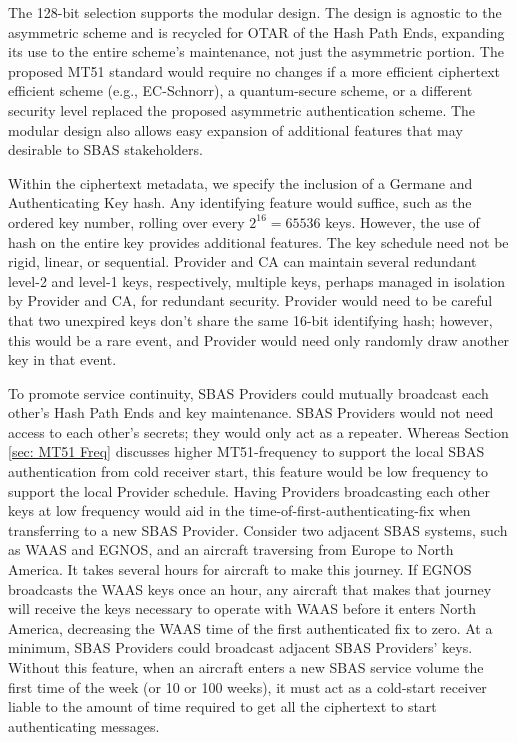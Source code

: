 \documentclass[letterpaper,times]{IONconf/IONconf}
\begin{document}
The 128-bit selection supports the modular design.
The design is agnostic to the asymmetric scheme and is recycled for OTAR of the Hash Path Ends, expanding its use to the entire scheme's maintenance, not just the asymmetric portion.
The proposed MT51 standard would require no changes if a more efficient ciphertext efficient scheme (e.g., EC-Schnorr), a quantum-secure scheme, or a different security level replaced the proposed asymmetric authentication scheme.
The modular design also allows easy expansion of additional features that may desirable to SBAS stakeholders.

Within the ciphertext metadata, we specify the inclusion of a Germane and Authenticating Key hash.
Any identifying feature would suffice, such as the ordered key number, rolling over every $2^{16} = 65536$ keys.
However, the use of hash on the entire key provides additional features.
The key schedule need not be rigid, linear, or sequential.
Provider and CA can maintain several redundant level-2 and level-1 keys, respectively, multiple keys, perhaps managed in isolation by Provider and CA, for redundant security.
Provider would need to be careful that two unexpired keys don't share the same 16-bit identifying hash; however, this would be a rare event, and Provider would need only randomly draw another key in that event.

To promote service continuity, SBAS Providers could mutually broadcast each other's Hash Path Ends and key maintenance.
SBAS Providers would not need access to each other's secrets; they would only act as a repeater.
Whereas Section \ref{sec: MT51 Freq} discusses higher MT51-frequency to support the local SBAS authentication from cold receiver start, this feature would be low frequency to support the local Provider schedule.
Having Providers broadcasting each other keys at low frequency would aid in the time-of-first-authenticating-fix when transferring to a new SBAS Provider.
Consider two adjacent SBAS systems, such as WAAS and EGNOS, and an aircraft traversing from Europe to North America.
It takes several hours for aircraft to make this journey.
If EGNOS broadcasts the WAAS keys once an hour, any aircraft that makes that journey will receive the keys necessary to operate with WAAS before it enters North America, decreasing the WAAS time of the first authenticated fix to zero. 
At a minimum, SBAS Providers could broadcast adjacent SBAS Providers' keys.
Without this feature, when an aircraft enters a new SBAS service volume the first time of the week (or 10 or 100 weeks), it must act as a cold-start receiver liable to the amount of time required to get all the ciphertext to start authenticating messages.
\end{document}

